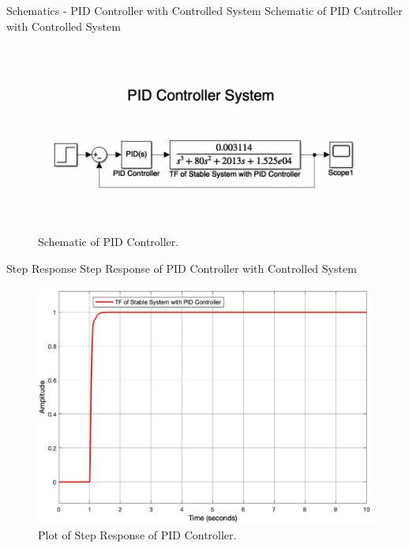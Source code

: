 \documentclass[10pt,compress,mathserif]{beamer}
\begin{document}
\begin{frame}{Schematics - PID Controller with Controlled System}
Schematic of PID Controller with Controlled System

\vskip10pt
\begin{figure}[h!]
\centering
\includegraphics[scale=0.6]{PID_Model.png}
\caption{Schematic of PID Controller.}
\end{figure}

\end{frame}

\begin{frame}{Step Response}
Step Response of PID Controller with Controlled System
\vskip10pt
\begin{figure}[h!]
\centering
\includegraphics[scale=0.2]{pid_response.jpg}
\caption{Plot of Step Response of PID Controller.}
\end{figure}


\end{frame}
\end{document}
